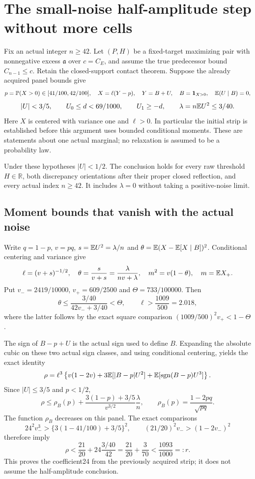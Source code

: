 \section{The small-noise half-amplitude step without more cells}
\label{sn:section}

Fix an actual integer $n\ge42$. Let $(P,H)$ be a fixed-target maximizing
pair with nonnegative excess $\mathfrak a$ over $c=C_E$, and assume the
true predecessor bound $C_{n-1}\le c$. Retain the closed-support contact
theorem. Suppose the already acquired panel bounds give
\[
 p=\mathbb P(X>0)\in[41/100,42/100],\quad
 X=\ell(Y-p),\quad Y=B+U,\quad B=\mathbf1_{X>0},\quad
 \mathbb E(U\mid B)=0,
\]
\[
 |U|<3/5,\qquad U_0\le d<69/1000,\qquad U_1\ge-d,
 \qquad\lambda=n\mathbb E U^2\le3/40.
\]
Here $X$ is centered with variance one and $\ell>0$. In particular the
initial strip is established before this argument uses bounded conditional
moments. These are statements about one actual marginal; no relaxation is
assumed to be a probability law.

\begin{theorem}\label{sn:theorem}
Under these hypotheses $|U|<1/2$. The conclusion holds for every raw
threshold $H\in\mathbb R$, both discrepancy orientations after their
proper closed reflection, and every actual index $n\ge42$. It includes
$\lambda=0$ without taking a positive-noise limit.
\end{theorem}

\subsection{Moment bounds that vanish with the actual noise}
Write $q=1-p$, $v=pq$, $s=\mathbb E U^2=\lambda/n$ and
$\theta=\mathbb E(X-\mathbb E[X\mid B])^2$. Conditional centering and variance give
\[
 \ell=(v+s)^{-1/2},\quad
 \theta=\frac{s}{v+s}=\frac{\lambda}{nv+\lambda},\quad
 m^2=v(1-\theta),\quad m=\mathbb E X_+.
\]
Put $v_-=2419/10000$, $v_+=609/2500$ and
$\Theta=733/100000$. Then
\[
 \theta\le\frac{3/40}{42v_-+3/40}<\Theta,
 \qquad \ell>\frac{1009}{500}=2.018,
\]
where the latter follows by the exact square comparison
$(1009/500)^2v_+<1-\Theta$.

The sign of $B-p+U$ is the actual sign used to define $B$. Expanding
the absolute cubic on these two actual sign classes, and using conditional
centering, yields the exact identity
\[
 \rho=\ell^3\left\{v(1-2v)+3\mathbb E[|B-p|U^2]
                  +\mathbb E[\operatorname{sgn}(B-p)U^3]\right\}.
\]
Since $|U|\le3/5$ and $p<1/2$,
\[
 \rho\le\rho_B(p)+\frac{3(1-p)+3/5}{v^{3/2}}\frac\lambda n,
 \qquad \rho_B(p)=\frac{1-2pq}{\sqrt{pq}}.
\]
The function $\rho_B$ decreases on this panel. The exact comparisons
\[
 24^2v_-^3>\{3(1-41/100)+3/5\}^2,
 \qquad (21/20)^2v_->(1-2v_-)^2
\]
therefore imply
\begin{equation}
 \rho<\frac{21}{20}+24\frac{3/40}{42}
       =\frac{21}{20}+\frac3{70}<\frac{1093}{1000}=:r.
 \label{sn:rho}
\end{equation}
This proves the coefficient24 from the previously acquired strip; it
does not assume the half-amplitude conclusion.

